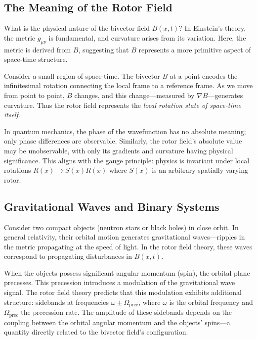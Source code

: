 \documentclass[11pt,a4paper]{article}
\numberwithin{equation}{section}
\theoremstyle{plain}
\theoremstyle{definition}
\theoremstyle{remark}
\begin{document}
\subsection{The Meaning of the Rotor Field}

What is the physical nature of the bivector field $B(x,t)$? In Einstein's theory, the metric $g_{\mu\nu}$ is fundamental, and curvature arises from its variation. Here, the metric is derived from $B$, suggesting that $B$ represents a more primitive aspect of space-time structure.

Consider a small region of space-time. The bivector $B$ at a point encodes the infinitesimal rotation connecting the local frame to a reference frame. As we move from point to point, $B$ changes, and this change---measured by $\nabla B$---generates curvature. Thus the rotor field represents the \emph{local rotation state of space-time itself}.

In quantum mechanics, the phase of the wavefunction has no absolute meaning; only phase differences are observable. Similarly, the rotor field's absolute value may be unobservable, with only its gradients and curvature having physical significance. This aligns with the gauge principle: physics is invariant under local rotations $R(x) \to S(x)R(x)$ where $S(x)$ is an arbitrary spatially-varying rotor.

\subsection{Gravitational Waves and Binary Systems}

Consider two compact objects (neutron stars or black holes) in close orbit. In general relativity, their orbital motion generates gravitational waves---ripples in the metric propagating at the speed of light. In the rotor field theory, these waves correspond to propagating disturbances in $B(x,t)$.

When the objects possess significant angular momentum (spin), the orbital plane precesses. This precession introduces a modulation of the gravitational wave signal. The rotor field theory predicts that this modulation exhibits additional structure: sidebands at frequencies $\omega \pm \Omega_{\mathrm{prec}}$, where $\omega$ is the orbital frequency and $\Omega_{\mathrm{prec}}$ the precession rate. The amplitude of these sidebands depends on the coupling between the orbital angular momentum and the objects' spins---a quantity directly related to the bivector field's configuration.
\end{document}
